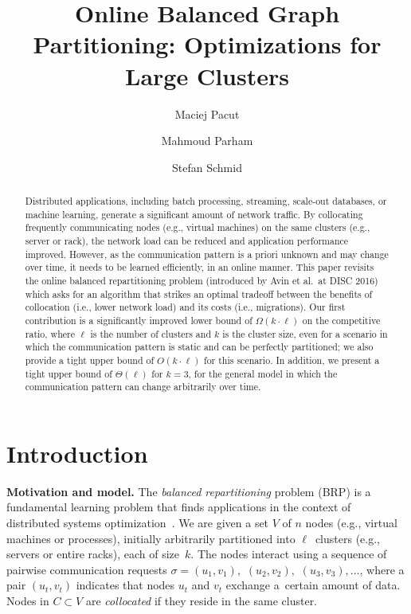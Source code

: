 \documentclass[manuscript,screen=true, review, anonymous]{acmart}
\title{Online Balanced Graph Partitioning: Optimizations for Large Clusters}
\author{Maciej Pacut}
\affiliation{%
  \institution{Faculty of Computer Science, University of Vienna}
  \country{Austria}
}
\author{Mahmoud Parham}
\affiliation{%
  \institution{Faculty of Computer Science, University of Vienna}
  \country{Austria}
}
\author{Stefan Schmid}
\affiliation{%
  \institution{Faculty of Computer Science, University of Vienna}
  \country{Austria}
}
\newcommand{\OBRP}{BRP}
\begin{document}
\begin{abstract}
Distributed   applications,  including  batch  processing, streaming, scale-out databases,
or machine learning, generate a significant amount of network traffic. By collocating frequently communicating nodes (e.g., virtual machines) on the same clusters (e.g., server or rack), the network load can be reduced and application performance improved. 
However, as the communication pattern is a priori unknown and may change over time, it needs to be learned efficiently, in an online manner.
%
This paper revisits the online 
balanced repartitioning problem 
(introduced by Avin et al.~at DISC 2016)
which asks for an algorithm that strikes
an optimal tradeoff between the benefits
of collocation (i.e., lower network load) 
and its costs (i.e., migrations). 
%
Our first contribution is a significantly improved
lower bound of $\Omega(k\cdot \ell)$ on the
competitive ratio, where $\ell$ is the number
of clusters and $k$ is the cluster size,
even for a scenario in which the communication
pattern is static and can be perfectly partitioned;
we also provide a tight upper bound 
of $O(k\cdot \ell)$ for this scenario.
In addition, we present a tight upper bound
of $\Theta(\ell)$ for $k=3$,
for the general model in which the
communication pattern can change arbitrarily
over time. 
\end{abstract}
    
\maketitle
    
\renewcommand{\shortauthors}{M.~Pacut, M.~Parham, S.~Schmid}

\section{Introduction}

\noindent \textbf{Motivation and model.}
The \emph{balanced repartitioning} problem (\OBRP{})
is a fundamental learning problem
that finds applications in the context of
distributed systems optimization~\cite{repartition-disc}. We are given a set $V$ of $n$ nodes 
(e.g., virtual machines or processes),
initially arbitrarily partitioned into $\ell$~clusters
(e.g., servers or entire racks),
each of size~$k$.
The nodes interact using
a sequence of pairwise communication requests
$\sigma = (u_1,v_1),$ $(u_2,v_2),$ $(u_3,v_3), \ldots$,
where a pair $(u_t,v_t)$ indicates that nodes $u_t$ and $v_t$ exchange a~certain amount of data.
Nodes in $C \subset V$ are \emph{collocated}
if they reside in the same cluster.
\end{document}
